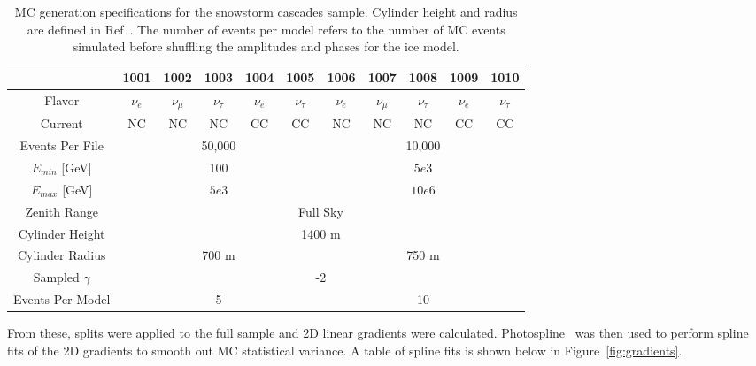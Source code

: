 \documentclass[main.tex]{subfiles}
\begin{document}
\begin{table}
    \centering
    \begin{tabular}{c | ccc ccc ccc c}\rowcolor{blue!25}
            & 1001 & 1002 & 1003 & 1004 & 1005 & 1006 & 1007 & 1008 & 1009 & 1010 \\\hline
        
    Flavor  &$\nu_{e}$ &$\nu_{\mu}$ &$\nu_{\tau}$ &$\nu_{e}$ &$\nu_{\tau}$ &$\nu_{e}$ &$\nu_{\mu}$ &$\nu_{\tau}$ &$\nu_{e}$ &$\nu_{\tau}$  \\
    Current & NC & NC & NC & CC & CC & NC & NC & NC & CC & CC \\
    Events Per File & \multicolumn{5}{c}{50,000} & \multicolumn{5}{c}{10,000} \\
    $E_{min}$ [GeV] & \multicolumn{5}{c}{100} & \multicolumn{5}{c}{$5e3$} \\
    $E_{max}$ [GeV] & \multicolumn{5}{c}{$5e3$} & \multicolumn{5}{c}{$10e6$}\\
    Zenith Range & \multicolumn{10}{c}{Full Sky}\\
    Cylinder Height & \multicolumn{10}{c}{1400 m}\\
    Cylinder Radius & \multicolumn{5}{c}{700 m} & \multicolumn{5}{c}{750 m} \\
    Sampled $\gamma$ & \multicolumn{10}{c}{-2} \\
    Events Per Model & \multicolumn{5}{c}{5} & \multicolumn{5}{c}{10} 
    \end{tabular}
    \caption{MC generation specifications for the snowstorm cascades sample. Cylinder height and radius are defined in Ref~\cite{ABBASI2021108018}. The number of events per model refers to the number of MC events simulated before shuffling the amplitudes and phases for the ice model.}\label{table:mc}
\end{table}

From these, splits were applied to the full sample and 2D linear gradients were calculated. 
Photospline~\cite{WHITEHORN20132214} was then used to perform spline fits of the 2D gradients to smooth out MC statistical variance. 
A table of spline fits is shown below in Figure~\ref{fig:gradients}. 
\end{document}
